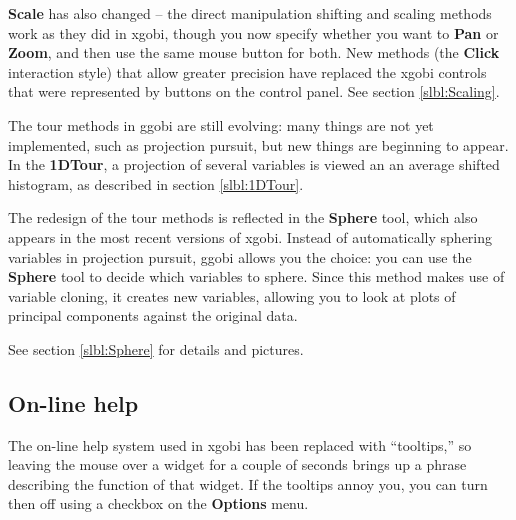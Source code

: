 \documentclass[11pt]{article}
\begin{document}
{\bf Scale} has also changed -- the direct manipulation shifting and
scaling methods work as they did in xgobi, though you now specify
whether you want to {\bf Pan} or {\bf Zoom}, and then use the same
mouse button for both.  New methods (the {\bf Click} interaction
style) that allow greater precision have replaced the xgobi controls
that were represented by buttons on the control panel.  See section
\ref{slbl:Scaling}.

The tour methods in ggobi are still evolving:  many things are not
yet implemented, such as projection pursuit, but new things are
beginning to appear.  In the {\bf 1DTour}, a projection of several
variables is viewed an an average shifted histogram, as described
in section \ref{slbl:1DTour}.

The redesign of the tour methods is reflected in the {\bf Sphere}
tool, which also appears in the most recent versions of xgobi.
Instead of automatically sphering variables in projection pursuit,
ggobi allows you the choice:  you can use the {\bf Sphere} tool to
decide which variables to sphere.  Since this method makes use of
variable cloning, it creates new variables, allowing you to look at
plots of principal components against the original data.

See section \ref{slbl:Sphere} for details and pictures.

\subsection{On-line help}

The on-line help system used in xgobi has been replaced with
``tooltips,'' so leaving the mouse over a widget for a couple of
seconds brings up a phrase describing the function of that widget.
If the tooltips annoy you, you can turn then off using a
checkbox on the {\bf Options} menu.
\end{document}
